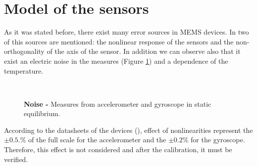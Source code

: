 \documentclass[conference]{IEEEtran}
\begin{document}
\section{Model of the sensors}
\label{sec:modelo}

As it was stated before, there exist many error sources in MEMS devices. In \cite{bib:calib_imu} two of this sources are mentioned: the nonlinear response of the sensors and the non-orthogonality of the axis of the sensor. In addition we can observe also that it exist an electric noise in the measures (Figure \ref{fig:noise}) and a dependence of the temperature.\\
\vspace{-10pt}
\begin{figure}[h!]
  \centering
  \\[-5pt]
  			\vspace{-5pt}
  \caption{\textbf{Noise -} Measures from accelerometer and gyroscope in static equilibrium.}
  \label{fig:noise}
\end{figure}

According to the datasheets of the devices (\cite{bib:acc_data, bib:gyro_data}), effect of nonlinearities represent the $\pm 0.5.\%$  of the full scale for the accelerometer and the $\pm 0.2\%$ for the gyroscope. Therefore, this effect is not considered and after the calibration, it must be verified.\\
\end{document}
